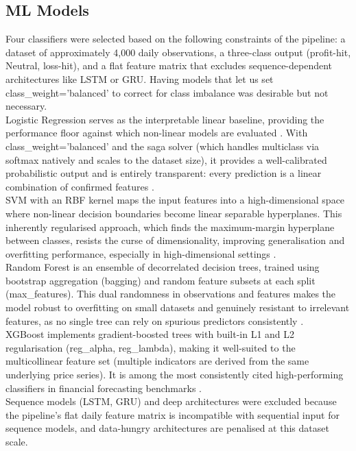 \subsection{ML Models}
Four classifiers were selected based on the following constraints of the pipeline: a dataset of approximately 4,000 daily observations, a three-class output (profit-hit, Neutral, loss-hit), and a flat feature matrix that excludes sequence-dependent architectures like LSTM or GRU. Having models that let us set class\_weight='balanced' to correct for class imbalance was desirable but not necessary.\\
Logistic Regression serves as the interpretable linear baseline, providing the performance floor against which non-linear models are evaluated \cite{ghoddusiMachineLearningEnergy2019}. With class\_weight='balanced' and the saga solver (which handles multiclass via softmax natively and scales to the dataset size), it provides a well-calibrated probabilistic output and is entirely transparent: every prediction is a linear combination of confirmed features \cite{LogisticRegression}.\\
SVM with an RBF kernel maps the input features into a high-dimensional space where non-linear decision boundaries become linear separable hyperplanes. This inherently regularised approach, which finds the maximum-margin hyperplane between classes, resists the curse of dimensionality, improving generalisation and overfitting performance, especially in high-dimensional settings \cite{renForecastingStockMarket2019, yuEvolvingLeastSquares2009}.\\
Random Forest is an ensemble of decorrelated decision trees, trained using bootstrap aggregation (bagging) and random feature subsets at each split (max\_features). This dual randomness in observations and features makes the model robust to overfitting on small datasets and genuinely resistant to irrelevant features, as no single tree can rely on spurious predictors consistently \cite{breimanRandomForests2001}.\\
XGBoost implements gradient-boosted trees with built-in L1 and L2 regularisation (reg\_alpha, reg\_lambda), making it well-suited to the multicollinear feature set (multiple indicators are derived from the same underlying price series). It is among the most consistently cited high-performing classifiers in financial forecasting benchmarks \cite{raoComparativeStudyStatistical2025, qureshiEvaluatingMachineLearning2025, eddiengaiTimeSeriesPrediction2023}.\\
Sequence models (LSTM, GRU) and deep architectures were excluded because the pipeline's flat daily feature matrix is incompatible with sequential input for sequence models, and data-hungry architectures are penalised at this dataset scale.
